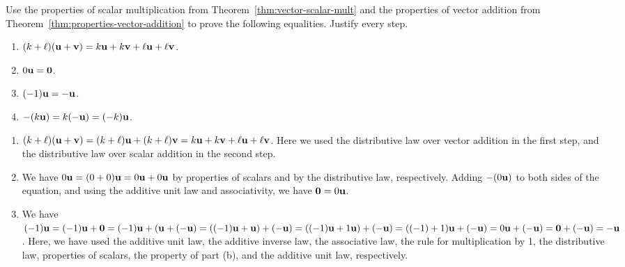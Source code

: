 \begin{ex}
  Use the properties of scalar multiplication from
  Theorem~\ref{thm:vector-scalar-mult} and the properties of vector
  addition from Theorem~\ref{thm:properties-vector-addition} to prove
  the following equalities. Justify every step.
  \begin{enumerate}
  \item $(k+\ell)(\mbox{\bf u}+\mbox{\bf v}) = k\mbox{\bf u} + k\mbox{\bf v} +
    \ell\mbox{\bf u} + \ell\mbox{\bf v}$.
  \item $0\mbox{\bf u} = \mbox{\bf 0}$.
  \item $(-1)\mbox{\bf u} = -\mbox{\bf u}$.
  \item $-(k\mbox{\bf u}) = k(-\mbox{\bf u}) = (-k)\mbox{\bf u}$.
  \end{enumerate}
  \begin{sol}
    \begin{enumerate}
    \item
      $(k+\ell)(\mbox{\bf u}+\mbox{\bf v}) = (k+\ell)\mbox{\bf u} +
      (k+\ell)\mbox{\bf v} = k\mbox{\bf u} + k\mbox{\bf v} + \ell\mbox{\bf u} +
      \ell\mbox{\bf v}$. Here we used the distributive law over vector
      addition in the first step, and the distributive law over scalar
      addition in the second step.
    \item We have $0\mbox{\bf u} = (0+0)\mbox{\bf u} = 0\mbox{\bf u} + 0\mbox{\bf u}$
      by properties of scalars and by the distributive law,
      respectively. Adding $-(0\mbox{\bf u})$ to both sides of the
      equation, and using the additive unit law and associativity, we
      have $\mbox{\bf 0} = 0\mbox{\bf u}$.
    \item We have $(-1)\mbox{\bf u} = (-1)\mbox{\bf u} + \mbox{\bf 0} =
      (-1)\mbox{\bf u} + (\mbox{\bf u} + (-\mbox{\bf u}) = ((-1)\mbox{\bf u} +
      \mbox{\bf u}) + (-\mbox{\bf u}) = ((-1)\mbox{\bf u} + 1\mbox{\bf u}) +
      (-\mbox{\bf u}) = ((-1)+1)\mbox{\bf u} + (-\mbox{\bf u}) = 0\mbox{\bf u} +
      (-\mbox{\bf u}) = \mbox{\bf 0} + (-\mbox{\bf u}) = -\mbox{\bf u}$. Here, we have
      used the additive unit law, the additive inverse law, the
      associative law, the rule for multiplication by 1, the
      distributive law, properties of scalars, the property of part
      (b), and the additive unit law, respectively.
    \end{enumerate}
  \end{sol}
\end{ex}


